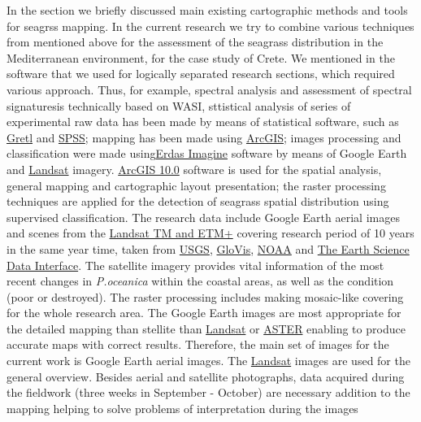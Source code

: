 \documentclass[10pt, a4paper]{article}
\begin{document}
In the section  we briefly discussed main existing cartographic methods and tools for seagrss mapping. In the current  research we try to combine various techniques from mentioned above for the assessment of the seagrass distribution in the Mediterranean environment, for the case study of Crete. We mentioned in  the software that we used for logically separated research sections, which required various approach. Thus, for example,  spectral analysis and assessment of spectral signaturesis technically based on WASI, sttistical analysis of series of experimental raw data has been made by means of statistical software, such as \href{http://gretl.sourceforge.net/}{Gretl} and \href{http://www.spss.com/}{SPSS}; mapping has been made using  \href{http://www.esri.com/software/arcgis/index.html}{ArcGIS}; images processing and classification were made using\href{http://www.erdas.com/products/ERDASIMAGINE/ERDASIMAGINE/Details.aspx}{Erdas Imagine} software by means of Google Earth and  \href{http://landsat.gsfc.nasa.gov/}{Landsat} imagery.
\href{http://www.esri.com/software/arcgis/index.html}{ArcGIS 10.0} software is used for the spatial analysis, general mapping and cartographic layout
presentation; the raster processing techniques are applied for the detection of seagrass spatial
distribution using supervised classification.
The research data include Google Earth aerial images and scenes from the \href{http://landsat.gsfc.nasa.gov/}{Landsat TM and ETM+}
covering research period of 10 years in the same year time, taken from \href{http://www.usgs.gov/pubprod/}{USGS}, \href{http://glovis.usgs.gov/}{GloVis}, \href{http://www.osdpd.noaa.gov/ml/index.html}{NOAA} and \href{http://glcfapp.glcf.umd.edu:8080/esdi/index.jsp}{The Earth Science Data Interface}. 
The satellite imagery provides
vital information of the most recent changes in \textit{P.oceanica} within the coastal areas, as well as the
condition (poor or destroyed).
The raster processing includes making mosaic-like covering for the whole research area. The Google
Earth images are most appropriate for the detailed mapping than stellite than \href{http://landsat.gsfc.nasa.gov/}{Landsat} or \href{http://asterweb.jpl.nasa.gov/}{ASTER} enabling to produce accurate maps with correct results. Therefore, the main set of images for the
current work is Google Earth aerial images. The  \href{http://landsat.gsfc.nasa.gov/}{Landsat} images are used for the general overview.
Besides aerial and satellite photographs, data acquired during the fieldwork (three weeks in September - October) are
necessary addition to the mapping helping to solve problems of interpretation during the images
\end{document}
